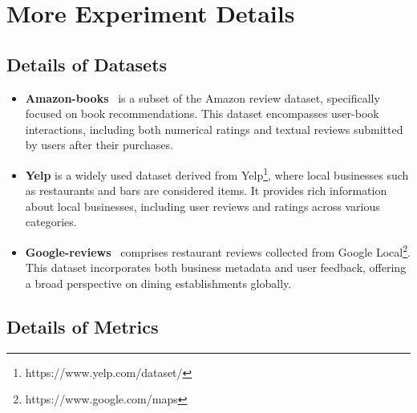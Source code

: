 \section{More Experiment Details}

\subsection{Details of Datasets}
\label{app:datasets}



\begin{itemize}[leftmargin=*]
    \item \textbf{Amazon-books}~\cite{ni2019justifying} is a subset of the Amazon review dataset, specifically focused on book recommendations. This dataset encompasses user-book interactions, including both numerical ratings and textual reviews submitted by users after their purchases. 
    \item \textbf{Yelp} \cite{ma2024xrec} is a widely used dataset derived from Yelp\footnote{https://www.yelp.com/dataset/}, where local businesses such as restaurants and bars are considered items. It provides rich information about local businesses, including user reviews and ratings across various categories.
    \item \textbf{Google-reviews}~\cite{li2022uctopic,yan2023personalized} comprises restaurant reviews collected from Google Local\footnote{https://www.google.com/maps}. 
    This dataset incorporates both business metadata and user feedback, offering a broad perspective on dining establishments globally.
\end{itemize}

\subsection{Details of Metrics}
\label{app:metrics}

